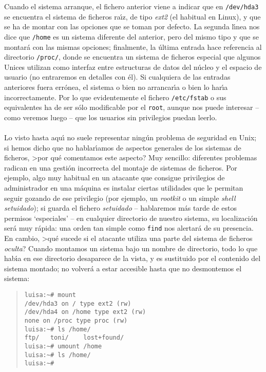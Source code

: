 Cuando el sistema arranque, el fichero anterior viene a indicar que en 
{\tt /dev/hda3} se encuentra el sistema de ficheros ra\'{\i}z, de tipo {\it
ext2} (el habitual en Linux), y que se ha de montar con las opciones que se
toman por defecto. La segunda l\'{\i}nea nos dice que {\tt /home} es un
sistema diferente del anterior, pero del mismo tipo y que se montar\'a
con las mismas opciones; finalmente, la \'ultima entrada hace referencia al
directorio {\tt /proc/}, donde se encuentra un sistema de ficheros especial
que algunos Unices utilizan como interfaz entre estructuras de datos del 
n\'ucleo y el espacio de usuario (no entraremos en detalles con \'el). Si 
cualquiera de las entradas anteriores fuera err\'onea, el sistema o bien no
arrancar\'{\i}a o bien lo har\'{\i}a incorrectamente. Por lo que evidentemente
el fichero {\tt /etc/fstab} o sus equivalentes ha de ser s\'olo modificable por 
el {\tt root}, aunque nos puede interesar -- como veremos luego -- que los 
usuarios sin privilegios puedan leerlo.\\
\\Lo visto hasta aqu\'{\i} no suele representar ning\'un problema de seguridad
en Unix; si hemos dicho que no hablar\'{\i}amos de aspectos generales de los
sistemas de ficheros, >por qu\'e comentamos este aspecto? Muy sencillo: 
diferentes problemas radican en una gesti\'on incorrecta del montaje de sistemas
de ficheros. Por ejemplo, algo muy habitual en un atacante que consigue 
privilegios de administrador en una m\'aquina es instalar ciertas utilidades que
le permitan seguir gozando de ese privilegio (por ejemplo, un {\it rootkit} o
un simple {\it shell} {\it setuidado}); si guarda el fichero {\it setuidado} -- 
hablaremos m\'as tarde de estos permisos `especiales' -- en cualquier 
directorio de nuestro sistema, su localizaci\'on ser\'a muy r\'apida: una orden 
tan simple como {\tt find} nos alertar\'a de su presencia. En cambio, >qu\'e 
sucede si el atacante utiliza una parte del sistema de ficheros {\it oculta}?
Cuando montamos un sistema bajo un nombre de directorio, todo lo que hab\'{\i}a
en ese directorio desaparece de la vista, y es sustituido por el contenido del
sistema montado; no volver\'a a estar accesible hasta que no desmontemos el
sistema:
\begin{quote}
\begin{verbatim}
luisa:~# mount
/dev/hda3 on / type ext2 (rw)
/dev/hda4 on /home type ext2 (rw)
none on /proc type proc (rw)
luisa:~# ls /home/
ftp/   toni/    lost+found/ 
luisa:~# umount /home
luisa:~# ls /home/
luisa:~#
\end{verbatim}
\end{quote}
